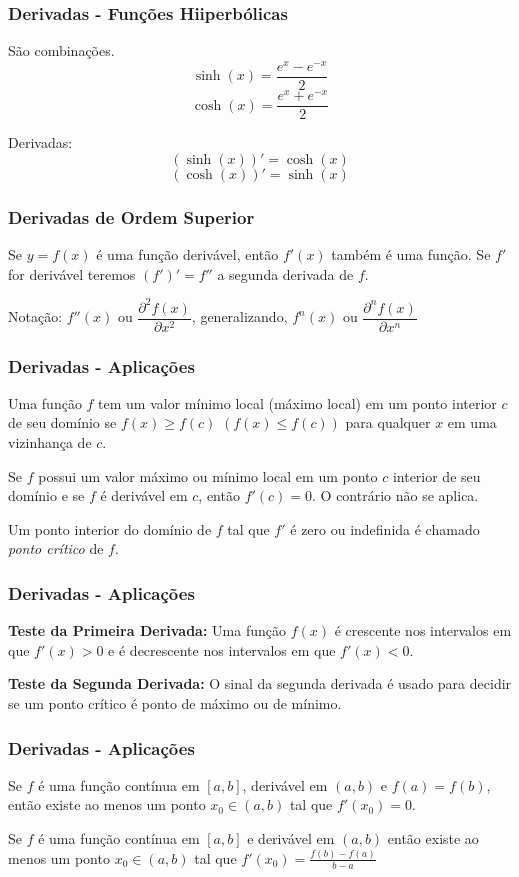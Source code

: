 \documentclass[hyperref={pdfpagelabels=false}]{beamer}
\begin{document}
\begin{frame}
\frametitle{Derivadas - Funções Hiiperbólicas}
São combinações.
$$\sinh(x) = \frac{e^x - e^{-x}}{2}$$
$$\cosh(x) = \frac{e^x +e^{-x}}{2}$$

Derivadas:
$$(\sinh(x))' = \cosh(x)$$
$$(\cosh(x))' = \sinh(x)$$

\end{frame}

\begin{frame}
\frametitle{Derivadas de Ordem Superior}
Se $y = f(x)$ é uma função derivável, então $f'(x)$ também é uma função. Se $f'$ for derivável teremos $(f')' = f''$ a segunda derivada de $f$.

Notação: $f''(x)$ ou $\dfrac{\partial ^2 f(x)}{\partial x^2}$, generalizando, $f^{n}(x)$ ou $\dfrac{\partial ^{n}f(x)}{\partial x^{n}}$

\end{frame}


\begin{frame}
\frametitle{Derivadas - Aplicações}
Uma função $f$ tem um valor mínimo local (máximo local) em um ponto interior $c$ de seu domínio se $f(x) \geq f(c)$ $(f(x) \leq f(c))$ para qualquer $x$ em uma vizinhança de $c$. \pause

Se $f$ possui um valor máximo ou mínimo local em um ponto $c$ interior de seu domínio e se $f$ é derivável em $c$, então $f'(c) = 0$. O contrário não se aplica. \pause

Um ponto interior do domínio de $f$ tal que $f'$ é zero ou indefinida é chamado \emph{ponto crítico} de $f$.

\end{frame}


\begin{frame}
\frametitle{Derivadas - Aplicações}
{\bf Teste da Primeira Derivada:} \pause Uma função $f(x)$ é crescente nos intervalos em que $f'(x) > 0$ e é decrescente nos intervalos em que $f'(x) < 0$. \pause

{\bf Teste da Segunda Derivada:} O sinal da segunda derivada é usado para decidir se um ponto crítico é ponto de máximo ou de mínimo.

\end{frame}

\begin{frame}
\frametitle{Derivadas - Aplicações}
\begin{theorem}[de Rolle]
	Se $f$ é uma função contínua em $[a,b]$, derivável em $(a,b)$ e $f(a) = f(b)$, então existe ao menos um ponto $x_0 \in (a,b)$ tal que $f'(x_0) = 0$.
\end{theorem}

\pause

\begin{theorem}
	Se $f$ é uma função contínua em $[a,b]$ e derivável em $(a,b)$ então existe ao menos um ponto $x_0 \in (a,b)$ tal que $f'(x_0) = \frac{f(b) - f(a)}{b-a}$
\end{theorem}



\end{frame}
\end{document}

